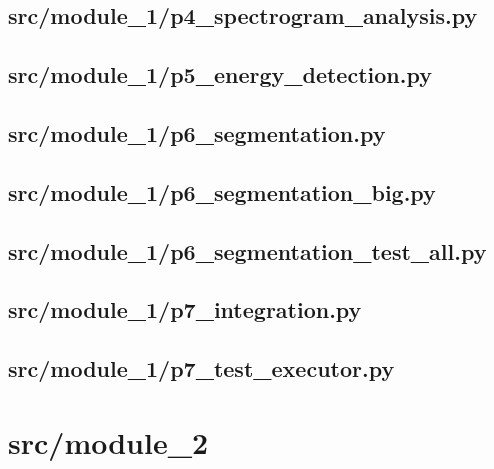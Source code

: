 \subsection*{src/module\_1/p4\_spectrogram\_analysis.py}
\label{ap:p4_spectrogram_analysis}

\subsection*{src/module\_1/p5\_energy\_detection.py}
\label{ap:p5_energy_detection}

\subsection*{src/module\_1/p6\_segmentation.py}
\label{ap:p6_segmentation}

\subsection*{src/module\_1/p6\_segmentation\_big.py}
\label{ap:p6_segmentation_big}

\subsection*{src/module\_1/p6\_segmentation\_test\_all.py}
\label{ap:p6_segmentation_test_all}

\subsection*{src/module\_1/p7\_integration.py}
\label{ap:p7_integration}

\subsection*{src/module\_1/p7\_test\_executor.py}
\label{ap:p7_test_executor}
\section{src/module\_2}

